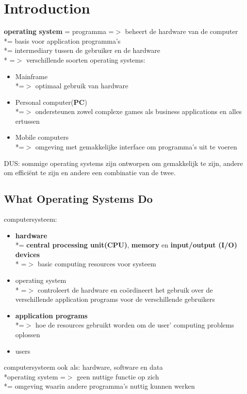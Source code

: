 \documentclass{report}
\begin{document}
\chapter{Introduction}
\textbf{operating system} = programma =$>$ beheert de hardware van de computer
\\*= basis voor application programma's
\\*= intermediary tussen de gebruiker en de hardware
\\* =$>$ verschillende soorten operating systems:
\begin{itemize}
	\item Mainframe 
	\\*=$>$ optimaal gebruik van hardware
	\item Personal computer(\textbf{PC})
	\\*=$>$ ondersteunen zowel complexe games als business 		applications en alles ertussen
	\item Mobile computers
	\\*=$>$ omgeving met gemakkelijke interface om programma's uit te voeren
\end{itemize}
DUS: sommige operating systems zijn ontworpen om gemakkelijk te zijn, andere om effici\"ent te zijn en andere een combinatie van de twee.

\section{What Operating Systems Do}
computersysteem:
\begin {itemize}
	\item \textbf{hardware}
	\\*= \textbf{central processing unit(CPU)}, \textbf{memory} en \textbf{input/output (I/O) devices}
	\\* =$>$ basic computing resources voor systeem
	\item operating system
	\\* =$>$ controleert de hardware en co\"ordineert het gebruik over de verschillende application programs voor de verschillende gebruikers
	\item \textbf{application programs}
	\\*=$>$ hoe de resources gebruikt worden om de user' computing problems oplossen
	\item users
\end {itemize}
computersysteem ook als: hardware, software en data
\\*operating system =$>$ geen nuttige functie op zich
\\*= omgeving waarin andere programma's nuttig kunnen werken
\end{document}
